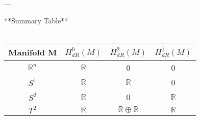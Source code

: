 \documentclass[10pt,a4paper]{report}
\begin{document}
 ---

 **Summary Table**\\ \\
 \begin{tabular}{|c|c|c|c|}
 \hline
  Manifold M & $H^0_{dR}(M)$ & $H^2_{dR}(M)$& $H^1_{dR}(M)$ \\
 \hline
  \( \mathbb{R}^n \) & \( \mathbb{R} \) & 0 & 0 \\
 \hline
 \( S^1 \) & \( \mathbb{R} \) & \( \mathbb{R} \) & 0 \\
 \hline
  \( S^2 \) & \( \mathbb{R} \) & 0 & \( \mathbb{R} \) \\
 \hline
 \( T^2 \) & \( \mathbb{R} \) & \( \mathbb{R} \oplus \mathbb{R} \) & \( \mathbb{R} \)\\
 \hline
 \end{tabular}\\
\end{document}
